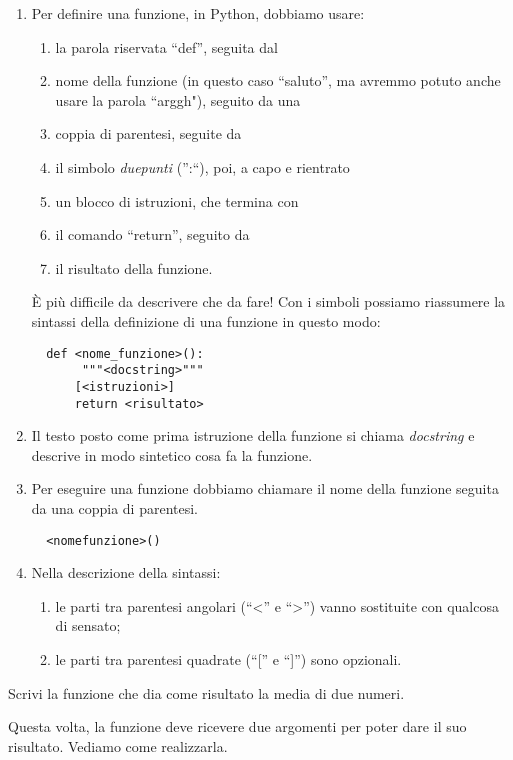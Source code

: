 \begin{osservazione}
 \begin{enumerate} [nosep]
  \item Per definire una funzione, in Python,  dobbiamo usare:
  \begin{enumerate} [noitemsep]
   \item la parola riservata  ``def'', seguita dal
   \item nome della funzione (in questo caso  ``saluto'', ma avremmo potuto 
anche usare la parola  ``arggh"), seguito da una
   \item coppia di parentesi, seguite da
   \item il simbolo \emph{duepunti} ('':``), poi, a capo e rientrato
   \item un blocco di istruzioni, che termina con
   \item il comando  ``return'', seguito da
   \item il risultato della funzione.
  \end{enumerate}

  È più difficile da descrivere che da fare!
  Con i simboli possiamo riassumere la sintassi della definizione di una 
funzione in questo modo:
\begin{lstlisting}
  def <nome_funzione>():
       """<docstring>"""
      [<istruzioni>]
      return <risultato>
\end{lstlisting}

  \item Il testo posto come prima istruzione della funzione si chiama 
\emph{docstring} e descrive in modo sintetico cosa fa la funzione.
  \item Per eseguire una funzione dobbiamo chiamare il nome della funzione 
seguita da una coppia di parentesi.
\begin{lstlisting}
  <nomefunzione>()
\end{lstlisting}
  \item Nella descrizione della sintassi:
  \begin{enumerate} [nosep]
   \item le parti tra parentesi angolari (``<'' e  ``>'') vanno sostituite 
con qualcosa di sensato;
   \item le parti tra parentesi quadrate (``['' e  ``]'') sono opzionali.
  \end{enumerate}
 \end{enumerate}
\end{osservazione}

\begin{esempio}
 Scrivi la funzione che dia come risultato la media di due numeri.

Questa volta, la funzione deve ricevere due argomenti per poter dare il suo 
risultato. Vediamo come realizzarla.


\end{esempio}

